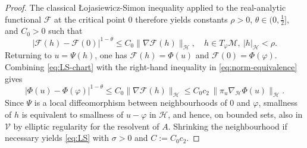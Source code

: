\documentclass[10pt,a4paper]{amsart}
\numberwithin{equation}{section}
\begin{document}
\begin{proof}
The classical \L{o}jasiewicz-Simon inequality applied to the real-analytic functional
$\mathcal F$ at the critical point $0$ therefore yields constants $\rho>0$,
$\theta\in(0,\tfrac12]$, and $C_0>0$ such that
\begin{equation}\label{eq:LS-chart}
|\mathcal F(h)-\mathcal F(0)|^{1-\theta}\le C_0\|\nabla\mathcal F(h)\|_{\mathcal H},
\quad h\in T_\varphi\mathcal M,\ |h|_{\mathcal H}<\rho.
\end{equation}
Returning to $u=\Psi(h)$, one has $\mathcal F(h)=\Phi(u)$ and
 $\mathcal F(0)=\Phi(\varphi)$.
Combining \eqref{eq:LS-chart} with the right-hand inequality in
\eqref{eq:norm-equivalence} gives
\[
|\Phi(u)-\Phi(\varphi)|^{1-\theta}
\le C_0\|\nabla\mathcal F(h)\|_{\mathcal H}
\le C_0 c_2\,\|\pi_u\nabla_{\mathcal H}\Phi(u)\|_{\mathcal H}.
\]
Since $\Psi$ is a local diffeomorphism between neighbourhoods of $0$ and $\varphi$,
smallness of $h$ is equivalent to smallness of $u-\varphi$ in $\mathcal H$, and hence,
on bounded sets, also in $\mathcal V$ by elliptic regularity for the resolvent of $A$.
Shrinking the neighbourhood if necessary yields \eqref{eq:LS} with $\sigma>0$ and
$C:=C_0c_2$.
\end{proof}
\end{document}
